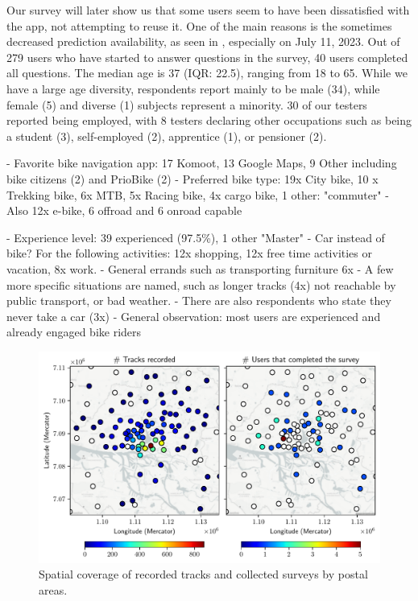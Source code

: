 Our survey will later show us that some users seem to have been dissatisfied with the app, not attempting to reuse it. One of the main reasons is the sometimes decreased prediction availability, as seen in , especially on July 11, 2023. Out of 279 users who have started to answer questions in the survey, 40 users completed all questions. The median age is 37 (IQR: 22.5), ranging from 18 to 65. While we have a large age diversity, respondents report mainly to be male (34), while female (5) and diverse (1) subjects represent a minority. 30 of our testers reported being employed, with 8 testers declaring other occupations such as being a student (3), self-employed (2), apprentice (1), or pensioner (2).

- Favorite bike navigation app: 17 Komoot, 13 Google Maps, 9 Other including bike citizens (2) and PrioBike (2)
- Preferred bike type: 19x City bike, 10 x Trekking bike, 6x MTB, 5x Racing bike, 4x cargo bike, 1 other: "commuter"
- Also 12x e-bike, 6 offroad and 6 onroad capable

- Experience level: 39 experienced (97.5\%), 1 other "Master"
- Car instead of bike? For the following activities: 12x shopping, 12x free time activities or vacation, 8x work.
- General errands such as transporting furniture 6x
- A few more specific situations are named, such as longer tracks (4x) not reachable by public transport, or bad weather.
- There are also respondents who state they never take a car (3x)
- General observation: most users are experienced and already engaged bike riders 

\begin{figure}[t]
\caption{Spatial coverage of recorded tracks and collected surveys by postal areas.}\label{fig:app-spatial-distribution}
\includegraphics[width=\linewidth]{images/app-spatial-distribution.pdf}
\end{figure}

